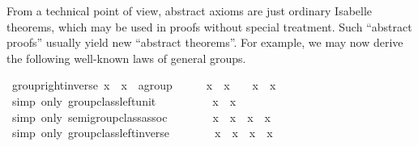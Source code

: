 \begin{isabellebody}
\begin{isamarkuptext}
  \medskip From a technical point of view, abstract axioms are just
  ordinary Isabelle theorems, which may be used in proofs without
  special treatment.  Such ``abstract proofs'' usually yield new
  ``abstract theorems''.  For example, we may now derive the following
  well-known laws of general groups.%
\end{isamarkuptext}%
\isamarkuptrue%
\isamarkupfalse%
\ group{\isacharunderscore}right{\isacharunderscore}inverse{\isacharcolon}\ {\isachardoublequoteopen}x\ {\isasymodot}\ x{\isasyminv}\ {\isacharequal}\ {\isacharparenleft}{\isasymone}{\isasymColon}{\isacharprime}a{\isasymColon}group{\isacharparenright}{\isachardoublequoteclose}\isanewline
%
\isadelimproof
%
\endisadelimproof
%
\isatagproof
{}\isamarkupfalse%
\ {\isacharminus}\isanewline
\ \ \isamarkupfalse%
\ {\isachardoublequoteopen}x\ {\isasymodot}\ x{\isasyminv}\ {\isacharequal}\ {\isasymone}\ {\isasymodot}\ {\isacharparenleft}x\ {\isasymodot}\ x{\isasyminv}{\isacharparenright}{\isachardoublequoteclose}\isanewline
\ \ \ \ \isamarkupfalse%
\ {\isacharparenleft}simp\ only{\isacharcolon}\ group{\isacharunderscore}class{\isachardot}left{\isacharunderscore}unit{\isacharparenright}\isanewline
\ \ \isamarkupfalse%
\ \isamarkupfalse%
\ {\isachardoublequoteopen}{\isachardot}{\isachardot}{\isachardot}\ {\isacharequal}\ {\isasymone}\ {\isasymodot}\ x\ {\isasymodot}\ x{\isasyminv}{\isachardoublequoteclose}\isanewline
\ \ \ \ \isamarkupfalse%
\ {\isacharparenleft}simp\ only{\isacharcolon}\ semigroup{\isacharunderscore}class{\isachardot}assoc{\isacharparenright}\isanewline
\ \ \isamarkupfalse%
\ \isamarkupfalse%
\ {\isachardoublequoteopen}{\isachardot}{\isachardot}{\isachardot}\ {\isacharequal}\ {\isacharparenleft}x{\isasyminv}{\isacharparenright}{\isasyminv}\ {\isasymodot}\ x{\isasyminv}\ {\isasymodot}\ x\ {\isasymodot}\ x{\isasyminv}{\isachardoublequoteclose}\isanewline
\ \ \ \ \isamarkupfalse%
\ {\isacharparenleft}simp\ only{\isacharcolon}\ group{\isacharunderscore}class{\isachardot}left{\isacharunderscore}inverse{\isacharparenright}\isanewline
\ \ \isamarkupfalse%
\ \isamarkupfalse%
\ {\isachardoublequoteopen}{\isachardot}{\isachardot}{\isachardot}\ {\isacharequal}\ {\isacharparenleft}x{\isasyminv}{\isacharparenright}{\isasyminv}\ {\isasymodot}\ {\isacharparenleft}x{\isasyminv}\ {\isasymodot}\ x{\isacharparenright}\ {\isasymodot}\ x{\isasyminv}{\isachardoublequoteclose}\isanewline

\end{isabellebody}
